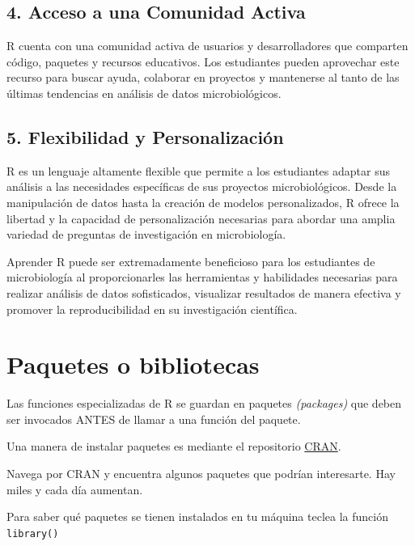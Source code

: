 \documentclass[
]{book}
\begin{document}
\hypertarget{acceso-a-una-comunidad-activa}{%
\subsection{4. Acceso a una Comunidad Activa}\label{acceso-a-una-comunidad-activa}}

R cuenta con una comunidad activa de usuarios y desarrolladores que comparten código, paquetes y recursos educativos. Los estudiantes pueden aprovechar este recurso para buscar ayuda, colaborar en proyectos y mantenerse al tanto de las últimas tendencias en análisis de datos microbiológicos.

\hypertarget{flexibilidad-y-personalizaciuxf3n}{%
\subsection{5. Flexibilidad y Personalización}\label{flexibilidad-y-personalizaciuxf3n}}

R es un lenguaje altamente flexible que permite a los estudiantes adaptar sus análisis a las necesidades específicas de sus proyectos microbiológicos. Desde la manipulación de datos hasta la creación de modelos personalizados, R ofrece la libertad y la capacidad de personalización necesarias para abordar una amplia variedad de preguntas de investigación en microbiología.

Aprender R puede ser extremadamente beneficioso para los estudiantes de microbiología al proporcionarles las herramientas y habilidades necesarias para realizar análisis de datos sofisticados, visualizar resultados de manera efectiva y promover la reproducibilidad en su investigación científica.

\hypertarget{paquetes-o-bibliotecas}{%
\section{Paquetes o bibliotecas}\label{paquetes-o-bibliotecas}}

Las funciones especializadas de R se guardan en paquetes \emph{(packages)} que deben ser invocados ANTES de llamar a una función del paquete.

Una manera de instalar paquetes es mediante el repositorio \href{https://cran.r-project.org/}{CRAN}.

Navega por CRAN y encuentra algunos paquetes que podrían interesarte. Hay miles y cada día aumentan.

Para saber qué paquetes se tienen instalados en
tu máquina teclea la función \texttt{library()}
\end{document}
